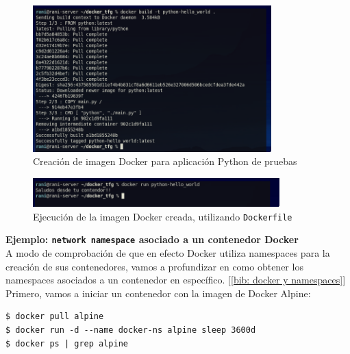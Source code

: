 \documentclass[a4paper, oneside, 12pt]{book}
\begin{document}
\begin{enumerate}
	\begin{figure}[h]
		\begin{center}
			\includegraphics[width=0.82\textwidth]{img/dockerfile_build.png}
			\caption{Creación de imagen Docker para aplicación Python de pruebas}
			\label{img: dockerfile python build}
		\end{center}
	\end{figure}

	\begin{figure}[h]
		\begin{center}
			\includegraphics[width=0.85\textwidth]{img/dockerfile_run.png}
			\caption{Ejecución de la imagen Docker creada, utilizando \texttt{Dockerfile}}
			\label{img: dockerfile python run}
		\end{center}
	\end{figure}
	
	\end{enumerate}
	
	\pagebreak
	
	\noindent \textbf{\large Ejemplo: \texttt{network namespace} asociado a un contenedor Docker}\\
	
	\noindent A modo de comprobación de que en efecto Docker utiliza namespaces para la creación de sus contenedores, vamos a profundizar en como obtener los namespaces asociados a un contenedor en específico. [\ref{bib: docker y namespaces}] \\
	
	\noindent Primero, vamos a iniciar un contenedor con la imagen de Docker Alpine:
	
	\begin{verbatim}
$ docker pull alpine
$ docker run -d --name docker-ns alpine sleep 3600d
$ docker ps | grep alpine
	\end{verbatim}
\end{document}
